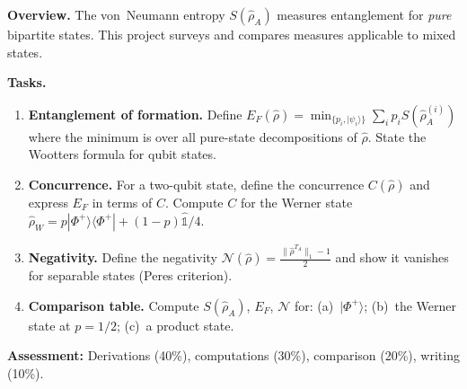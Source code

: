 \documentclass[11pt,a4paper]{article}
\begin{document}
\bigskip

\begin{tcolorbox}[gradprobbox, title={Project SG2 --- Entanglement Measures Beyond von Neumann Entropy}]

\textbf{Overview.}
The von~Neumann entropy $S(\hat{\rho}_A)$ measures entanglement for \emph{pure} bipartite
states. This project surveys and compares measures applicable to mixed states.

\medskip\textbf{Tasks.}
\begin{enumerate}[leftmargin=1.8em, label=\textbf{\arabic*.}, itemsep=6pt]
  \item \textbf{Entanglement of formation.}
        Define $E_F(\hat{\rho})=\min_{\{p_i,|\psi_i\rangle\}}\sum_i p_i S(\hat{\rho}_A^{(i)})$
        where the minimum is over all pure-state decompositions of $\hat{\rho}$.
        State the Wootters formula for qubit states.
  \item \textbf{Concurrence.}
        For a two-qubit state, define the concurrence $C(\hat{\rho})$ and express
        $E_F$ in terms of $C$.
        Compute $C$ for the Werner state $\hat{\rho}_W=p|\Phi^+\rangle\langle\Phi^+|+(1-p)\hat{\mathbb{1}}/4$.
  \item \textbf{Negativity.}
        Define the negativity $\mathcal{N}(\hat{\rho})=\tfrac{\|\hat{\rho}^{T_A}\|_1-1}{2}$
        and show it vanishes for separable states (Peres criterion).
  \item \textbf{Comparison table.}
        Compute $S(\hat{\rho}_A)$, $E_F$, $\mathcal{N}$ for:
        (a)~$|\Phi^+\rangle$; (b)~the Werner state at $p=1/2$; (c)~a product state.
\end{enumerate}

\medskip\textbf{Assessment:} Derivations (40\%), computations (30\%), comparison (20\%), writing (10\%).
\end{tcolorbox}

\bigskip
\end{document}
